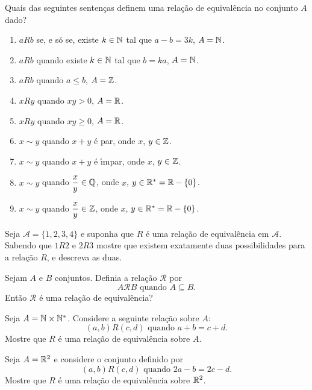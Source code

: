 \documentclass[12pt]{exam}
\begin{document}
    \questao{} Quais das seguintes senten{\c c}as definem uma rela{\c c}{\~a}o de equival{\^e}ncia no conjunto $A$ dado?
    \begin{enumerate}[label={\alph*})]
        \item $aRb$ se, e s{\'o} se, existe $k \in \mathbb{N}$ tal que $a - b = 3k$, $A = \mathbb{N}$.
        \item $aRb$ quando existe $k \in \mathbb{N}$ tal que $b = k a$, $A = \mathbb{N}$.
        \item $aRb$ quando $a \le b$, $A = \mathbb{Z}$.
        \item $xRy$ quando $xy > 0$, $ A = \mathbb{R}$.
        \item $xRy$ quando $xy \ge 0$, $ A = \mathbb{R}$.
        \item $x \sim y$ quando $x + y$ \'e par, onde $x$, $y \in \mathbb{Z}$.
        \item $x \sim y$ quando $x + y$ \'e {\'\i}mpar, onde $x$, $y \in \mathbb{Z}$.
        \item $x \sim y$ quando $\dfrac{x}{y} \in \mathbb{Q}$, onde $x$, $y \in \mathbb{R}^* = \mathbb{R} - \{0\}$.
        \item $x \sim y$ quando $\dfrac{x}{y} \in \mathbb{Z}$, onde $x$, $y \in \mathbb{R}^* = \mathbb{R} - \{0\}$.
    \end{enumerate}

    \vspace{.3cm}

    \questao{} Seja $\mathcal{A} = \{1,2,3,4\}$ e suponha que $R$ \'e uma rela\c{c}\~ao de equival\^encia em $\mathcal{A}$. Sabendo que $1R2$ e $2R3$ mostre que existem exatamente duas possibilidades para a rela\c{c}\~ao $R$, e descreva as duas.

    \vspace{.3cm}

    \questao{} Sejam $A$ e $B$ conjuntos. Definia a rela{\c c}\~ao $\mathcal{R}$ por
    \[
        A \mathcal{R} B \mbox{ quando } A \subseteq B.
    \]
    Ent\~ao $\mathcal{R}$ \'e uma rela{\c c}\~ao de equival\^encia?

    \vspace{.3cm}

    \questao{} Seja $A = \mathbb{N} \times \mathbb{N}^*$. Considere a seguinte
    rela{\c c}{\~a}o sobre $A$:
    \[
        (a,b) R (c,d) \mbox{ quando } a + b = c + d.
    \]
    Mostre que $R$ {\'e} uma rela{\c c}{\~a}o de equival{\^e}ncia sobre $A$.

    \vspace{.3cm}

    \questao{} Seja $A = \mathbb{R}^2$ e considere o conjunto definido por
    \[
      (a,b)R(c,d) \mbox{ quando } 2a - b = 2c - d.
    \]
    Mostre que $R$ \'e uma rela\c{c}\~ao de equival\^encia sobre $\mathbb{R}^2$.
\end{document}
